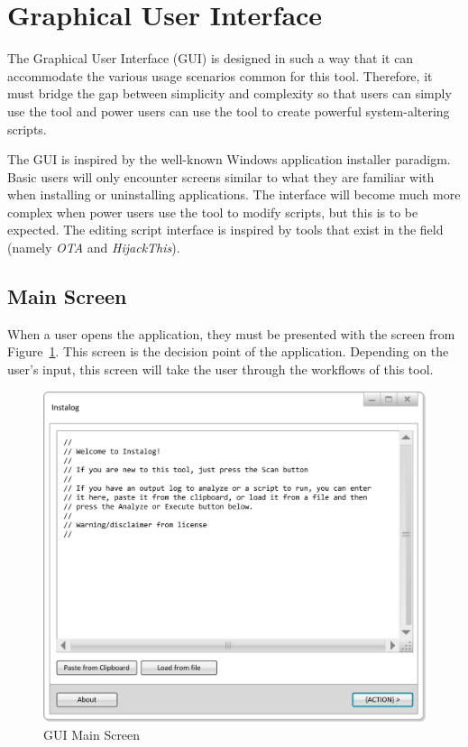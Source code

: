 \section{Graphical User Interface}
The Graphical User Interface (GUI) is designed in such a way that it can
accommodate the various usage scenarios common for this tool.  Therefore, it
must bridge the gap between simplicity and complexity so that users can simply
use the tool and power users can use the tool to create powerful system-altering
scripts.

The GUI is inspired by the well-known Windows application installer paradigm. 
Basic users will only encounter screens similar to what they are familiar with
when installing or uninstalling applications.  The interface will become much
more complex when power users use the tool to modify scripts, but this is to be
expected.  The editing script interface is inspired by tools that exist in the
field (namely \textit{OTA} and \textit{HijackThis}).

\subsection{Main Screen}
When a user opens the application, they must be presented with the screen from
Figure~\ref{fig:gui_main}.  This screen is the decision point of the
application.  Depending on the user's input, this screen will take the user
through the workflows of this tool.

\begin{figure}[!ht]
  	\centering
	\includegraphics{figures/gui/Main.png}
  	\caption{GUI Main Screen}
  	\label{fig:gui_main}
\end{figure}

